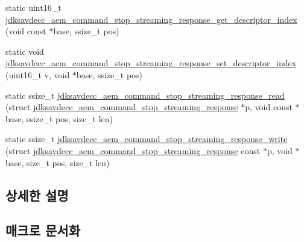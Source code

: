 \begin{DoxyCompactItemize}
\item 
static uint16\+\_\+t \hyperlink{group__command__stop__streaming__response_gae809969de67ed8d5343a27f6aeac63a8}{jdksavdecc\+\_\+aem\+\_\+command\+\_\+stop\+\_\+streaming\+\_\+response\+\_\+get\+\_\+descriptor\+\_\+index} (void const $\ast$base, ssize\+\_\+t pos)
\item 
static void \hyperlink{group__command__stop__streaming__response_ga31c56cce512c8bd52c4c19b1dee7226b}{jdksavdecc\+\_\+aem\+\_\+command\+\_\+stop\+\_\+streaming\+\_\+response\+\_\+set\+\_\+descriptor\+\_\+index} (uint16\+\_\+t v, void $\ast$base, ssize\+\_\+t pos)
\item 
static ssize\+\_\+t \hyperlink{group__command__stop__streaming__response_ga50d25eaa408322fe1b3ca4ca1bc8fa19}{jdksavdecc\+\_\+aem\+\_\+command\+\_\+stop\+\_\+streaming\+\_\+response\+\_\+read} (struct \hyperlink{structjdksavdecc__aem__command__stop__streaming__response}{jdksavdecc\+\_\+aem\+\_\+command\+\_\+stop\+\_\+streaming\+\_\+response} $\ast$p, void const $\ast$base, ssize\+\_\+t pos, size\+\_\+t len)
\item 
static ssize\+\_\+t \hyperlink{group__command__stop__streaming__response_ga7c21299b5205a3641abed2be83cf8a30}{jdksavdecc\+\_\+aem\+\_\+command\+\_\+stop\+\_\+streaming\+\_\+response\+\_\+write} (struct \hyperlink{structjdksavdecc__aem__command__stop__streaming__response}{jdksavdecc\+\_\+aem\+\_\+command\+\_\+stop\+\_\+streaming\+\_\+response} const $\ast$p, void $\ast$base, size\+\_\+t pos, size\+\_\+t len)
\end{DoxyCompactItemize}


\subsection{상세한 설명}


\subsection{매크로 문서화}

